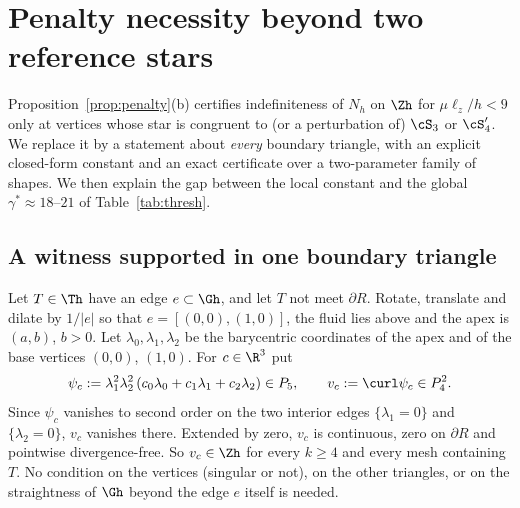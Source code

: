 
\section{Penalty necessity beyond two reference stars}\label{pb:sec}

Proposition~\ref{prop:penalty}(b) certifies indefiniteness of $N_h$ on $\Zh$ for $\mu\ell_z/h<9$ only at vertices whose star is
congruent to (or a perturbation of) $\cS_3$ or $\cS_4'$. We replace it by a statement about \emph{every} boundary triangle, with
an explicit closed-form constant and an exact certificate over a two-parameter family of shapes. We then explain the gap
between the local constant and the global $\gamma^\ast\approx18$--$21$ of Table~\ref{tab:thresh}.

\subsection{A witness supported in one boundary triangle}

Let $T\in\Th$ have an edge $e\subset\Gh$, and let $T$ not meet $\partial R$. Rotate, translate and dilate by $1/|e|$ so that
$e=[(0,0),(1,0)]$, the fluid lies above and the apex is $(a,b)$, $b>0$. Let $\lambda_0,\lambda_1,\lambda_2$ be the barycentric
coordinates of the apex and of the base vertices $(0,0)$, $(1,0)$. For $c\in\R^3$ put
\[
\psi_c:=\lambda_1^2\lambda_2^2\,(c_0\lambda_0+c_1\lambda_1+c_2\lambda_2)\in P_5,\qquad v_c:=\curl\psi_c\in P_4^2 .
\]
Since $\psi_c$ vanishes to second order on the two interior edges $\{\lambda_1=0\}$ and $\{\lambda_2=0\}$, $v_c$ vanishes there.
Extended by zero, $v_c$ is continuous, zero on $\partial R$ and pointwise divergence-free. So $v_c\in\Zh$ for every $k\ge4$ and
every mesh containing $T$. No condition on the vertices (singular or not), on the other triangles, or on the straightness of
$\Gh$ beyond the edge $e$ itself is needed.

